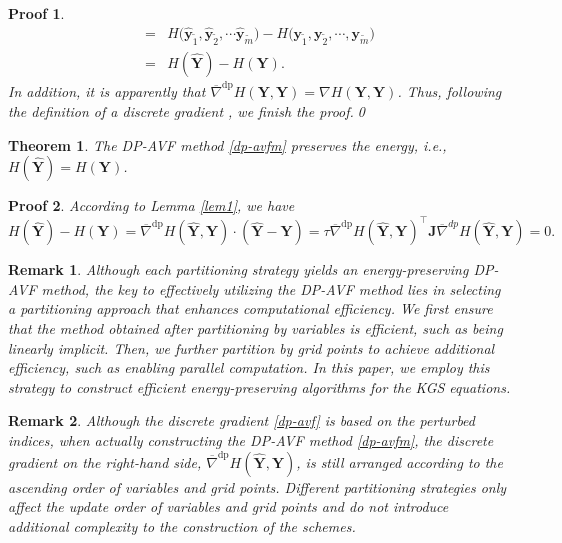 \documentclass[fleqn,11pt]{elsarticle}
\numberwithin{equation}{section}
\newtheorem{thm}{Theorem}[section]
\newtheorem{rmk}{Remark}[section]
\newtheorem*{prf}{Proof}
\begin{document}
\begin{prf}
\[\begin{aligned}
			= & H\big(\widehat{\bm y}_{\widetilde{1}}, \widehat{\bm y}_{\widetilde{2}}, \cdots \widehat{\bm y}_{\widetilde{m}}\big)-H\big(\bm y_{\widetilde{1}},  \bm y_{\widetilde{2}}, \cdots, \bm y_{\widetilde{m}}\big)                                                                                                                                                                                             \\
			= & H(\widehat{\bm Y})-H(\bm Y).
		\end{aligned}
	\]
	In addition, it is apparently that $\overline{\nabla}^{\text{dp}}H({\bm Y},\bm Y)=\nabla H({\bm Y},\bm Y)$. Thus, following the definition of a discrete gradient \cite{mclachlan1999geometric}, we finish the proof.\qed

\end{prf}


\begin{thm}\label{thm1}
	The DP-AVF method \eqref{dp-avfm} preserves the energy, i.e., $H(\widehat{\bm Y})=H(\bm Y)$.
\end{thm}

\begin{prf}
	According to Lemma \ref{lem1}, we have
	\[
		H(\widehat{\bm Y})-H(\bm Y)=\overline{\nabla}^{\text{dp}}H(\widehat{\bm Y},\bm Y)\cdot (\widehat{\bm Y}-\bm Y)=\tau \overline{\nabla}^{\text{dp}}H(\widehat{\bm Y},\bm Y)^\top\bm J\overline{\nabla}^{dp}H(\widehat{\bm Y},\bm Y)=0.
	\]
\end{prf}


\begin{rmk}\label{rmk1}
	Although each partitioning strategy yields an energy-preserving DP-AVF method, the key to effectively utilizing the DP-AVF method lies in selecting a partitioning approach that enhances computational efficiency. We first ensure that the method obtained after partitioning by variables is efficient, such as being linearly implicit. Then, we further partition by grid points to achieve additional efficiency, such as enabling parallel computation. In this paper, we employ this strategy to construct efficient energy-preserving algorithms for the KGS equations.
\end{rmk}


\begin{rmk}

	Although the discrete gradient \eqref{dp-avf} is based on the perturbed indices, when actually constructing the DP-AVF method \eqref{dp-avfm}, the discrete gradient on the right-hand side, $\overline{\nabla}^{\text{dp}}H(\widehat{\bm Y},\bm Y)$, is still arranged according to the ascending order of variables and grid points. Different partitioning strategies only affect the update order of variables and grid points and do not introduce additional complexity to the construction of the schemes.

\end{rmk}
\end{document}
